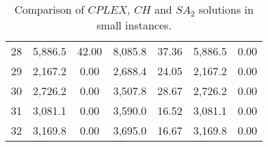 \documentclass[11pt]{article}
\begin{document}
\begin{table}[H]
\begin{tabular}{@{}ccccccc@{}}
\multicolumn{1}{c|}{28}       & 5,886.5       & 42.00      & 8,085.8                   & 37.36          & 5,886.5     & 0.00     \\
\multicolumn{1}{c|}{29}       & 2,167.2       & 0.00      & 2,688.4                   & 24.05          & 2,167.2     & 0.00     \\
\multicolumn{1}{c|}{30}       & 2,726.2       & 0.00      & 3,507.8                   & 28.67          & 2,726.2     & 0.00     \\
\multicolumn{1}{c|}{31}       & 3,081.1       & 0.00      & 3,590.0                   & 16.52          & 3,081.1     & 0.00     \\
\multicolumn{1}{c|}{32}       & 3,169.8       & 0.00      & 3,695.0                   & 16.67          & 3,169.8     & 0.00     \\ \bottomrule
\end{tabular}
\caption{Comparison of $CPLEX$, $CH$ and $SA_{2}$ solutions in small instances.}
	\label{cplex_results}%
\end{table}




\end{document}
